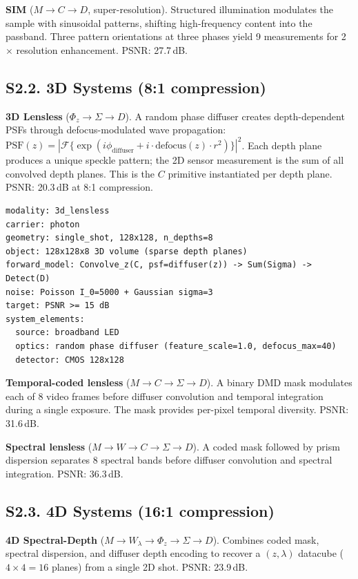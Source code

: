 \documentclass[11pt,a4paper]{article}
\begin{document}
\textbf{SIM} ($M \to C \to D$, super-resolution).
Structured illumination modulates the sample with sinusoidal patterns, shifting high-frequency content into the passband.  Three pattern orientations at three phases yield 9 measurements for 2$\times$ resolution enhancement.  PSNR: 27.7\,dB.

\subsection{S2.2. 3D Systems (8:1 compression)}

\textbf{3D Lensless} ($\Phi_z \to \Sigma \to D$).
A random phase diffuser creates depth-dependent PSFs through defocus-modulated wave propagation: $\text{PSF}(z) = |\mathcal{F}\{\exp(i\phi_{\text{diffuser}} + i \cdot \text{defocus}(z) \cdot r^2)\}|^2$.  Each depth plane produces a unique speckle pattern; the 2D sensor measurement is the sum of all convolved depth planes.  This is the $C$ primitive instantiated per depth plane.  PSNR: 20.3\,dB at 8:1 compression.

\begin{verbatim}
modality: 3d_lensless
carrier: photon
geometry: single_shot, 128x128, n_depths=8
object: 128x128x8 3D volume (sparse depth planes)
forward_model: Convolve_z(C, psf=diffuser(z)) -> Sum(Sigma) -> Detect(D)
noise: Poisson I_0=5000 + Gaussian sigma=3
target: PSNR >= 15 dB
system_elements:
  source: broadband LED
  optics: random phase diffuser (feature_scale=1.0, defocus_max=40)
  detector: CMOS 128x128
\end{verbatim}

\textbf{Temporal-coded lensless} ($M \to C \to \Sigma \to D$).
A binary DMD mask modulates each of 8 video frames before diffuser convolution and temporal integration during a single exposure.  The mask provides per-pixel temporal diversity.  PSNR: 31.6\,dB.

\textbf{Spectral lensless} ($M \to W \to C \to \Sigma \to D$).
A coded mask followed by prism dispersion separates 8 spectral bands before diffuser convolution and spectral integration.  PSNR: 36.3\,dB.

\subsection{S2.3. 4D Systems (16:1 compression)}

\textbf{4D Spectral-Depth} ($M \to W_\lambda \to \Phi_z \to \Sigma \to D$).
Combines coded mask, spectral dispersion, and diffuser depth encoding to recover a $(z, \lambda)$ datacube ($4 \times 4 = 16$ planes) from a single 2D shot.  PSNR: 23.9\,dB.
\end{document}
